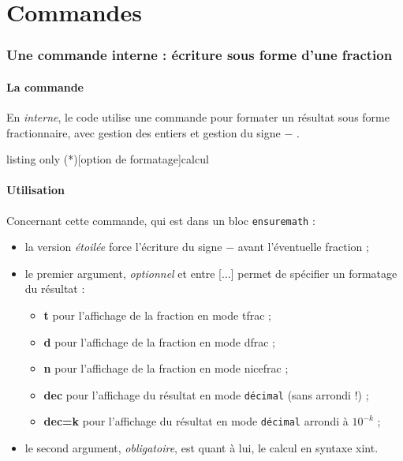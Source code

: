\documentclass[a4paper,11pt]{article}
\newcommand\Cle[1]{{\bfseries\sffamily\textlangle #1\textrangle}}
\begin{document}
\pagebreak

\part{Commandes}

\section{Une commande interne : écriture sous forme d'une fraction}

\subsection{La commande}

\begin{cautionblock}
En \textit{interne}, le code utilise une commande pour formater un résultat sous forme fractionnaire, avec gestion des entiers et gestion du signe \og $-$ \fg.
\end{cautionblock}

\begin{PresentationCode}{listing only}
\ConvVersFrac(*)[option de formatage]{calcul}
\end{PresentationCode}

\subsection{Utilisation}

\begin{tipblock}
Concernant cette commande, qui est dans un bloc \texttt{ensuremath} :

\begin{itemize}
	\item la version \textit{étoilée} force l'écriture du signe \og $-$ \fg{} avant l'éventuelle fraction ;
	\item le premier argument, \textit{optionnel} et entre \textsf{[...]} permet de spécifier un formatage du résultat :
	\begin{itemize}
		\item \Cle{t} pour l'affichage de la fraction en mode \textsf{tfrac} ;
		\item \Cle{d} pour l'affichage de la fraction en mode \textsf{dfrac} ;
		\item \Cle{n} pour l'affichage de la fraction en mode \textsf{nicefrac} ;
		\item \Cle{dec} pour l'affichage du résultat en mode \texttt{décimal} (sans arrondi !) ;
		\item \Cle{dec=k} pour l'affichage du résultat en mode \texttt{décimal} arrondi à $10^{-k}$ ;
	\end{itemize}
	\item le second argument, \textit{obligatoire}, est quant à lui, le calcul en syntaxe \textsf{xint}.
\end{itemize}
\vspace*{-\baselineskip}\leavevmode
\end{tipblock}
\end{document}
